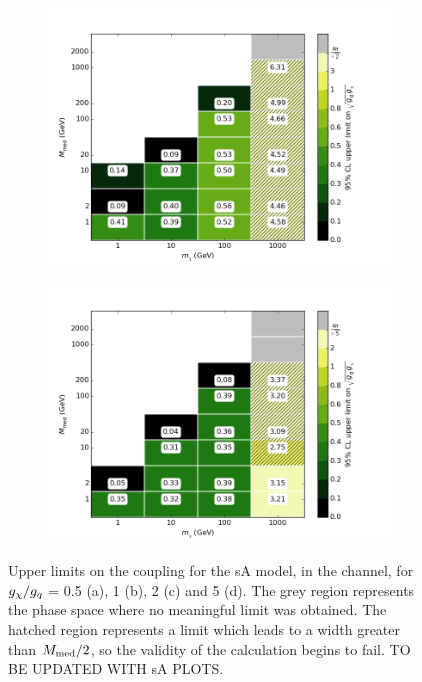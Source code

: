 \begin{figure}[h]
\begin{subfigure}[t]{0.495\textwidth}
      \includegraphics[width=1.\textwidth]{figures/grid_basepoints_SVD_rat2_monojet.png}
      \caption{}
    \end{subfigure}
    \begin{subfigure}[t]{0.495\textwidth}
      \centering
      \includegraphics[width=1.\textwidth]{figures/grid_basepoints_SVD_rat5_monojet.png}
      \caption{}
    \end{subfigure}
    \caption{Upper limits on the coupling for the sA model, in the \monojet channel, for $g_{\chi} / g_q$ = 0.5 (a), 1 (b), 2 (c) and 5 (d). The grey region represents the phase space where no meaningful limit was obtained. The hatched region represents a limit which leads to a width greater than $M_{\mathrm{med}} / 2$, so the validity of the calculation begins to fail. TO BE UPDATED WITH sA PLOTS.}
    \label{fig:Monojet_SVD_couplinglimit}
\end{figure}

